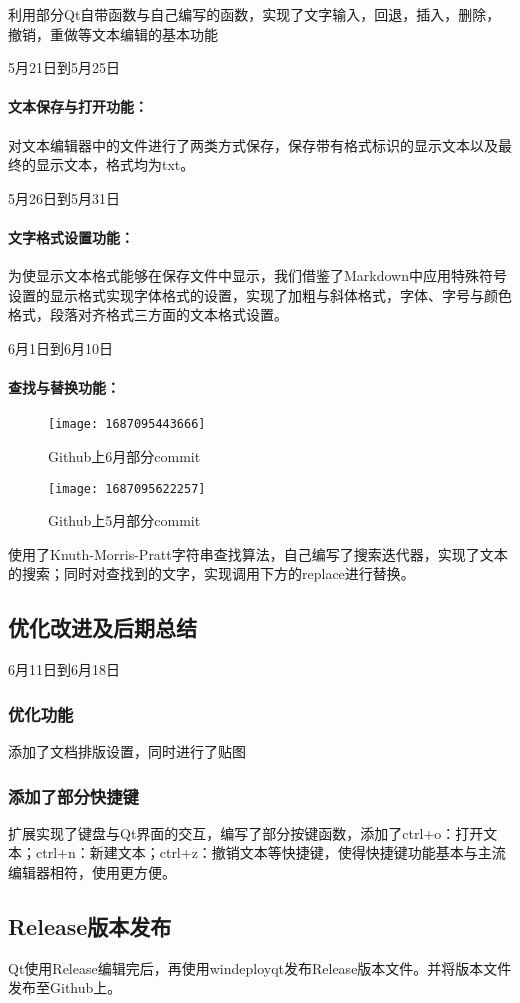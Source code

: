 \documentclass{./source/Report}
\begin{document}
利用部分Qt自带函数与自己编写的函数，实现了文字输入，回退，插入，删除，撤销，重做等文本编辑的基本功能

5月21日到5月25日

\paragraph{文本保存与打开功能：}

对文本编辑器中的文件进行了两类方式保存，保存带有格式标识的显示文本以及最终的显示文本，格式均为txt。

5月26日到5月31日

\paragraph{文字格式设置功能：}

为使显示文本格式能够在保存文件中显示，我们借鉴了Markdown中应用特殊符号设置的显示格式实现字体格式的设置，实现了加粗与斜体格式，字体、字号与颜色格式，段落对齐格式三方面的文本格式设置。

6月1日到6月10日

\paragraph{查找与替换功能：}
\begin{figure}[!htbp]
    \begin{minipage}{0.45\textwidth}
        \centering
        \texttt{[image: 1687095443666]}
        \caption{Github上6月部分commit}
    \end{minipage}
    \begin{minipage}{0.45\textwidth}
        \centering
        \texttt{[image: 1687095622257]}
        \caption{Github上5月部分commit}
    \end{minipage}
\end{figure}
使用了Knuth-Morris-Pratt字符串查找算法，自己编写了搜索迭代器，实现了文本的搜索；同时对查找到的文字，实现调用下方的replace进行替换。

\subsection{优化改进及后期总结}
6月11日到6月18日

\subsubsection{优化功能}

添加了文档排版设置，同时进行了贴图

\subsubsection{添加了部分快捷键}

扩展实现了键盘与Qt界面的交互，编写了部分按键函数，添加了ctrl+o：打开文本；ctrl+n：新建文本；ctrl+z：撤销文本等快捷键，使得快捷键功能基本与主流编辑器相符，使用更方便。

\subsection{Release版本发布}
Qt使用Release编辑完后，再使用windeployqt发布Release版本文件。并将版本文件发布至Github上。
\end{document}
